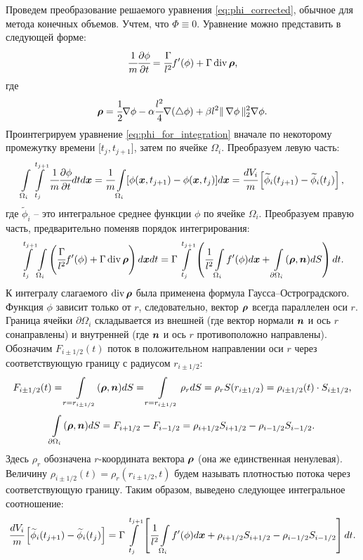 Проведем преобразование решаемого уравнения \eqref{eq:phi_corrected}, обычное для метода конечных объемов. Учтем, что $\Phi \equiv 0$. Уравнение можно представить в следующей форме:
\begin{equation}
    \cfrac{1}{m} \cfrac{\partial \phi}{\partial t} = \cfrac{\Gamma}{l^2} f'(\phi) + \Gamma \operatorname{{div}} {\boldsymbol{\rho}} {\text{,}}
    \label{eq:phi_for_integration}
\end{equation}
где
\begin{equation}
    {\boldsymbol{\rho}} = \cfrac{1}{2} \nabla \phi - \alpha \cfrac{l^2}{4} \nabla (\triangle \phi) + \beta l^2 \| \, \nabla \phi \, \|_2^2 \nabla \phi {\text{.}}
    \label{eq:rho}
\end{equation}
Проинтегрируем уравнение \eqref{eq:phi_for_integration} вначале по некоторому промежутку времени [$t_j, t_{j + 1}]$, затем по ячейке $\Omega_i$. Преобразуем левую часть:
$$\int\limits_{\Omega_i} \int\limits_{t_j}^{t_{j + 1}} \cfrac{1}{m} \cfrac{\partial \phi}{\partial t} dt d {\boldsymbol{x}} = \cfrac{1}{m} \int\limits_{\Omega_i} [\phi({\boldsymbol{x}}, t_{j + 1}) - \phi({\boldsymbol{x}}, t_j)] d {\boldsymbol{x}} = \cfrac{dV_i}{m} \left[ \widetilde{\phi}_i(t_{j + 1}) - \widetilde{\phi}_i(t_j) \right] {\text{,}}$$
где $\widetilde{\phi}_i$ -- это интегральное среднее функции $\phi$ по ячейке $\Omega_i$. Преобразуем правую часть, предварительно поменяв порядок интегрирования:
$$\int\limits_{t_j}^{t_{j + 1}} \int\limits_{\Omega_i} \left( \cfrac{\Gamma}{l^2} f'(\phi) + \Gamma \operatorname{{div}} {\boldsymbol{\rho}} \right) d {\boldsymbol{x}} dt = \Gamma \int\limits_{t_j}^{t_{j + 1}} \left( \cfrac{1}{l^2} \int\limits_{\Omega_i} f'(\phi) d {\boldsymbol{x}} + \int\limits_{\partial \Omega_i} ({\boldsymbol{\rho}}, {\boldsymbol{n}}) dS \right) dt {\text{.}}$$
К интегралу слагаемого $\operatorname{{div}} {\boldsymbol{\rho}}$ была применена формула Гаусса--Остроград\-ского. Функция $\phi$ зависит только от $r$, следовательно, вектор ${\boldsymbol{\rho}}$ всегда параллелен оси $r$. Граница ячейки $\partial \Omega_i$ складывается из внешней (где вектор нормали ${\boldsymbol{n}}$ и ось $r$ сонаправлены) и внутренней (где ${\boldsymbol{n}}$ и ось $r$ противоположно направлены). Обозначим $F_{i \pm 1/2}(t)$ поток в положительном направлении оси $r$ через соответствующую границу с радиусом $r_{i \pm 1/2}$:
$$F_{i \pm 1/2}(t) = \int\limits_{r = r_{i \pm 1/2}} ({\boldsymbol{\rho}}, {\boldsymbol{n}}) dS = \int\limits_{r = r_{i \pm 1/2}} \rho_r dS = \rho_r S(r_{i \pm 1/2}) = \rho_{i \pm 1/2}(t) \cdot S_{i \pm 1/2} {\text{,}}$$
$$\int\limits_{\partial \Omega_i} ({\boldsymbol{\rho}}, {\boldsymbol{n}}) dS = F_{i + 1/2} - F_{i - 1/2} = \rho_{i + 1/2} S_{i + 1/2} - \rho_{i - 1/2} S_{i - 1/2} {\text{.}}$$
Здесь $\rho_r$ обозначена $r$-координата вектора ${\boldsymbol{\rho}}$ (она же единственная ненулевая). Величину $\rho_{i \pm 1/2}(t) = \rho_r(r_{i \pm 1/2}, t)$ будем называть плотностью потока через соответствующую границу. Таким образом, выведено следующее интегральное соотношение:
\begin{equation}
    \cfrac{dV_i}{m} \left[ \widetilde{\phi}_i(t_{j + 1}) - \widetilde{\phi}_i(t_j) \right] = \Gamma \int\limits_{t_j}^{t_{j + 1}} \left[ \cfrac{1}{l^2} \int\limits_{\Omega_i} f'(\phi) d {\boldsymbol{x}} + \rho_{i + 1/2} S_{i + 1/2} - \rho_{i - 1/2} S_{i - 1/2} \right] dt {\text{.}}
    \label{eq:finite_volume_integral}
\end{equation}

